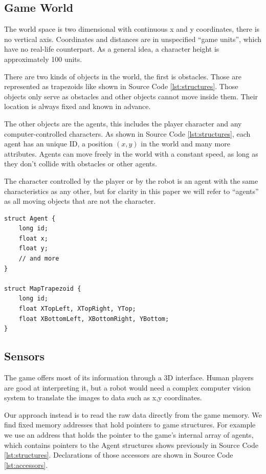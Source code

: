 \documentclass[]{article}
\begin{document}
\subsection{Game World}
The world space is two dimensional with continuous x and y coordinates, there is no vertical axis. Coordinates and distances are in unspecified ``game units'', which have no real-life counterpart. As a general idea, a character height is approximately 100 units. 

There are two kinds of objects in the world, the first is obstacles. Those are represented as trapezoids like shown in Source Code \ref{lst:structures}. Those objects only serve as obstacles and other objects cannot move inside them. Their location is always fixed and known in advance.

The other objects are the agents, this includes the player character and any computer-controlled characters. As shown in Source Code \ref{lst:structures}, each agent has an unique ID, a position $(x, y)$ in the world and many more attributes. Agents can move freely in the world with a constant speed, as long as they don't collide with obstacles or other agents.

The character controlled by the player or by the robot is an agent with the same characteristics as any other, but for clarity in this paper we will refer to ``agents'' as all moving objects that are not the character. 

\begin{lstlisting}[caption={Game Structures}, label=lst:structures]
struct Agent {
    long id;
    float x;
    float y;
    // and more
}

struct MapTrapezoid {
    long id;
    float XTopLeft, XTopRight, YTop;
    float XBottomLeft, XBottomRight, YBottom;
}
\end{lstlisting}

\subsection{Sensors}
The game offers most of its information through a 3D interface. Human players are good at interpreting it, but a robot would need a complex computer vision system to translate the images to data such as x,y coordinates. 

Our approach instead is to read the raw data directly from the game memory. We find fixed memory addresses that hold pointers to game structures. For example we use an address that holds the pointer to the game's internal array of agents, which contains pointers to the Agent structures shows previously in Source Code \ref{lst:structures}. Declarations of those accessors are shown in Source Code \ref{lst:accessors}.
\end{document}
